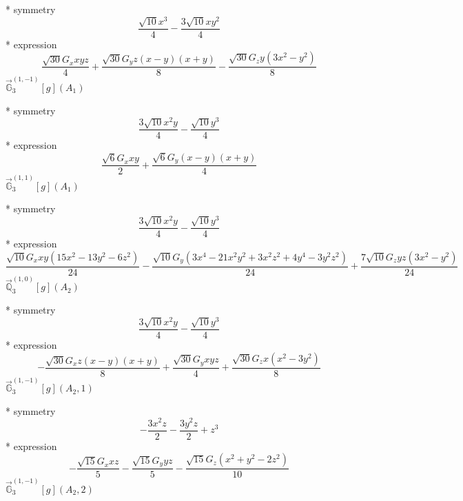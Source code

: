 \documentclass[fleqn,8pt]{jsarticle}
\begin{document}
\noindent\quad ** symmetry
\begin{dmath*}
\frac{\sqrt{10} x^{3}}{4} - \frac{3 \sqrt{10} x y^{2}}{4}
\end{dmath*}
\noindent\quad ** expression
\begin{dmath*}
\frac{\sqrt{30} G_{x} x y z}{4} + \frac{\sqrt{30} G_{y} z \left(x - y\right) \left(x + y\right)}{8} - \frac{\sqrt{30} G_{z} y \left(3 x^{2} - y^{2}\right)}{8}
\end{dmath*}
\noindent\quad $\vec{\mathbb{G}}_{3}^{(1,-1)}[g](A_{1})$

\noindent\quad ** symmetry
\begin{dmath*}
\frac{3 \sqrt{10} x^{2} y}{4} - \frac{\sqrt{10} y^{3}}{4}
\end{dmath*}
\noindent\quad ** expression
\begin{dmath*}
\frac{\sqrt{6} G_{x} x y}{2} + \frac{\sqrt{6} G_{y} \left(x - y\right) \left(x + y\right)}{4}
\end{dmath*}
\noindent\quad $\vec{\mathbb{G}}_{3}^{(1,1)}[g](A_{1})$

\noindent\quad ** symmetry
\begin{dmath*}
\frac{3 \sqrt{10} x^{2} y}{4} - \frac{\sqrt{10} y^{3}}{4}
\end{dmath*}
\noindent\quad ** expression
\begin{dmath*}
\frac{\sqrt{10} G_{x} x y \left(15 x^{2} - 13 y^{2} - 6 z^{2}\right)}{24} - \frac{\sqrt{10} G_{y} \left(3 x^{4} - 21 x^{2} y^{2} + 3 x^{2} z^{2} + 4 y^{4} - 3 y^{2} z^{2}\right)}{24} + \frac{7 \sqrt{10} G_{z} y z \left(3 x^{2} - y^{2}\right)}{24}
\end{dmath*}
\noindent\quad $\vec{\mathbb{Q}}_{3}^{(1,0)}[g](A_{2})$

\noindent\quad ** symmetry
\begin{dmath*}
\frac{3 \sqrt{10} x^{2} y}{4} - \frac{\sqrt{10} y^{3}}{4}
\end{dmath*}
\noindent\quad ** expression
\begin{dmath*}
- \frac{\sqrt{30} G_{x} z \left(x - y\right) \left(x + y\right)}{8} + \frac{\sqrt{30} G_{y} x y z}{4} + \frac{\sqrt{30} G_{z} x \left(x^{2} - 3 y^{2}\right)}{8}
\end{dmath*}
\noindent\quad $\vec{\mathbb{G}}_{3}^{(1,-1)}[g](A_{2},1)$

\noindent\quad ** symmetry
\begin{dmath*}
- \frac{3 x^{2} z}{2} - \frac{3 y^{2} z}{2} + z^{3}
\end{dmath*}
\noindent\quad ** expression
\begin{dmath*}
- \frac{\sqrt{15} G_{x} x z}{5} - \frac{\sqrt{15} G_{y} y z}{5} - \frac{\sqrt{15} G_{z} \left(x^{2} + y^{2} - 2 z^{2}\right)}{10}
\end{dmath*}
\noindent\quad $\vec{\mathbb{G}}_{3}^{(1,-1)}[g](A_{2},2)$
\end{document}
